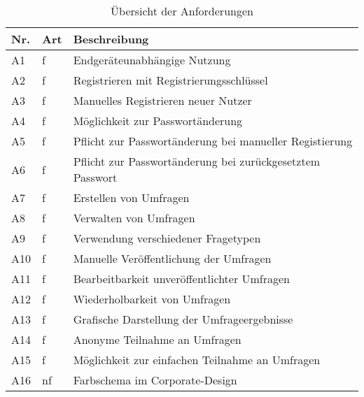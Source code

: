\begin{table}
  \setlength\extrarowheight{3pt}
\centering
  \begin{tabular}{|C{1cm}|C{1cm}|L{12cm}|}
    \hline
    \textbf{Nr.} & \textbf{Art} & \textbf{Beschreibung} \\
    \hline
    {\label{Anf:A1}A1} & f & Endgeräteunabhängige Nutzung \\
    \hline
    {\label{Anf:A2}A2} & f & Registrieren mit Registrierungsschlüssel \\
    \hline
    {\label{Anf:A3}A3} & f & Manuelles Registrieren neuer Nutzer \\
    \hline
    {\label{Anf:A4}A4} & f & Möglichkeit zur Passwortänderung \\
    \hline
    {\label{Anf:A5}A5} & f & Pflicht zur Passwortänderung bei manueller Registierung \\
    \hline
    {\label{Anf:A6}A6} & f & Pflicht zur Passwortänderung bei zurückgesetztem Passwort \\
    \hline
    {\label{Anf:A7}A7} & f & Erstellen von Umfragen \\
    \hline
    {\label{Anf:A8}A8} & f & Verwalten von Umfragen \\
    \hline
    {\label{Anf:A9}A9} & f & Verwendung verschiedener Fragetypen \\
    \hline
    {\label{Anf:A10}A10} & f & Manuelle Veröffentlichung der Umfragen \\
    \hline
    {\label{Anf:A11}A11} & f & Bearbeitbarkeit unveröffentlichter Umfragen \\
    \hline
    {\label{Anf:A12}A12} & f & Wiederholbarkeit von Umfragen \\
    \hline
    {\label{Anf:A13}A13} & f & Grafische Darstellung der Umfrageergebnisse \\
    \hline
    {\label{Anf:A14}A14} & f & Anonyme Teilnahme an Umfragen \\
    \hline
    {\label{Anf:A15}A15} & f & Möglichkeit zur einfachen Teilnahme an Umfragen \\
    \hline
    {\label{Anf:A16}A16} & nf & Farbschema im Corporate-Design \\
    \hline
  \end{tabular}
  \caption{Übersicht der Anforderungen}
  \label{tab:Anforderungen}
\end{table}
